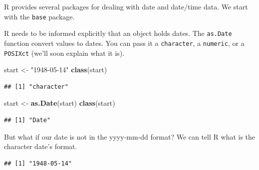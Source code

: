 \documentclass[]{book}
\newenvironment{Shaded}{\begin{snugshade}}{\end{snugshade}}
\newcommand{\DataTypeTok}[1]{\textcolor[rgb]{0.13,0.29,0.53}{#1}}
\newcommand{\KeywordTok}[1]{\textcolor[rgb]{0.13,0.29,0.53}{\textbf{#1}}}
\newcommand{\NormalTok}[1]{#1}
\newcommand{\StringTok}[1]{\textcolor[rgb]{0.31,0.60,0.02}{#1}}
\theoremstyle{definition}
\theoremstyle{definition}
\theoremstyle{definition}
\theoremstyle{remark}
\begin{document}
R provides several packages for dealing with date and date/time data.
We start with the \texttt{base} package.

R needs to be informed explicitly that an object holds dates.
The \texttt{as.Date} function convert values to dates.
You can pass it a \texttt{character}, a \texttt{numeric}, or a \texttt{POSIXct} (we'll soon explain what it is).

\begin{Shaded}
\begin{Highlighting}[]
\NormalTok{start <-}\StringTok{ "1948-05-14"}
\KeywordTok{class}\NormalTok{(start)}
\end{Highlighting}
\end{Shaded}

\begin{verbatim}
## [1] "character"
\end{verbatim}

\begin{Shaded}
\begin{Highlighting}[]
\NormalTok{start <-}\StringTok{ }\KeywordTok{as.Date}\NormalTok{(start)}
\KeywordTok{class}\NormalTok{(start)}
\end{Highlighting}
\end{Shaded}

\begin{verbatim}
## [1] "Date"
\end{verbatim}

But what if our date is not in the yyyy-mm-dd format?
We can tell R what is the character date's format.

\begin{Shaded}
\end{Shaded}

\begin{verbatim}
## [1] "1948-05-14"
\end{verbatim}

\begin{Shaded}
\end{Shaded}
\end{document}
